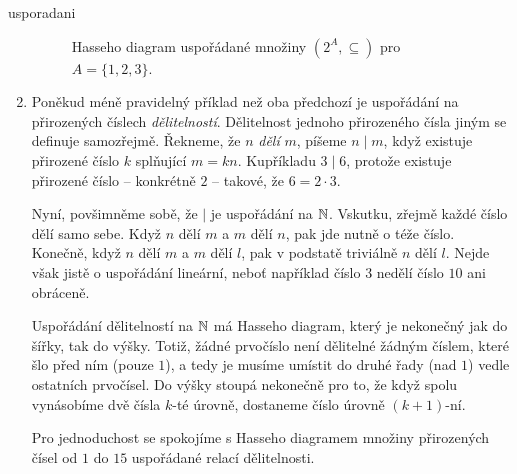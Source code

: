 \begin{example}{}{usporadani}
\begin{enumerate}
\begin{figure}[H]

    \caption{Hasseho diagram uspořádané množiny $(2^{A}, \subseteq )$ pro $A =
    \{1,2,3\}$.}
    \label{fig:hasseho-diagram-power-set}
   \end{figure}
  \item Poněkud méně pravidelný příklad než oba předchozí je uspořádání na
   přirozených číslech \emph{dělitelností}. Dělitelnost jednoho přirozeného
   čísla jiným se definuje samozřejmě. Řekneme, že $n$ \emph{dělí} $m$, píšeme
   $n \mid m$, když existuje přirozené číslo $k$ splňující $m = kn$. Kupříkladu
   $3 \mid 6$, protože existuje přirozené číslo -- konkrétně $2$ -- takové, že
   $6 = 2 \cdot 3$.

   Nyní, povšimněme sobě, že $ \mid $ je uspořádání na $\mathbb{N}$. Vskutku, zřejmě
   každé číslo dělí samo sebe. Když $n$ dělí $m$ a $m$ dělí $n$, pak jde nutně o
   téže číslo. Konečně, když $n$ dělí $m$ a $m$ dělí $l$, pak v podstatě
   triviálně $n$ dělí $l$. Nejde však jistě o uspořádání lineární, neboť
   například číslo $3$ nedělí číslo $10$ ani obráceně.
  
   Uspořádání dělitelností na $\mathbb{N}$ má Hasseho diagram, který je nekonečný jak do
   šířky, tak do výšky. Totiž, žádné prvočíslo není dělitelné žádným číslem,
   které šlo před ním (pouze $1$), a tedy je musíme umístit do druhé řady (nad
   $1$) vedle ostatních prvočísel. Do výšky stoupá nekonečně pro to, že když
   spolu vynásobíme dvě čísla $k$-té úrovně, dostaneme číslo úrovně $(k+1)$-ní.
  
   Pro jednoduchost se spokojíme s Hasseho diagramem množiny přirozených čísel
   od $1$ do $15$ uspořádané relací dělitelnosti.
   \begin{figure}[H]
    \centering
\end{figure}
\end{enumerate}
\end{example}
